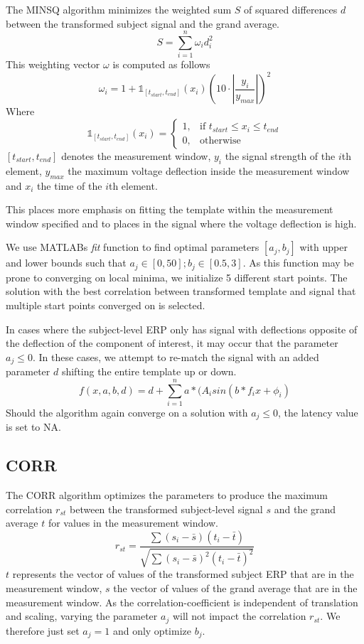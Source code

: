 \documentclass[
  man]{apa7}
\begin{document}
The MINSQ algorithm minimizes the weighted sum \(S\) of squared differences \(d\) between the transformed subject signal and the grand average.
\[S = \sum_{i = 1}^{n}\omega_{i}d_{i}^2\]
This weighting vector \(\omega\) is computed as follows
\[\omega_i = 1+\mathbb{1}_{[t_{start}, t_{end}]}(x_i)(10 \cdot |\frac{y_i}{y_{max}}|)^2\]
Where
\[\mathbb{1}_{[t_{start}, t_{end}]}(x_i) = \begin{cases} 1, & \text{if $t_{start} \le x_i \le t_{end}$} \\ 0, & \text{otherwise}\end{cases}\]\([t_{start}, t_{end}]\) denotes the measurement window, \(y_{i}\) the signal strength of the \(i\)th element, \(y_{max}\) the maximum voltage deflection inside the measurement window and \(x_i\) the time of the \(i\)th element.

This places more emphasis on fitting the template within the measurement window specified and to places in the signal where the voltage deflection is high.

We use MATLABs \emph{fit} function to find optimal parameters \([a_j, b_j]\) with upper and lower bounds such that \(a_j \in [0, 50]; b_j \in [0.5, 3]\). As this function may be prone to converging on local minima, we initialize 5 different start points. The solution with the best correlation between transformed template and signal that multiple start points converged on is selected.

In cases where the subject-level ERP only has signal with deflections opposite of the deflection of the component of interest, it may occur that the parameter \(a_j \le 0\). In these cases, we attempt to re-match the signal with an added parameter \(d\) shifting the entire template up or down.
\[f(x, a,b, d) = d +\sum_{i = 1}^{n} a*(A_isin(b*f_ix + \phi_i)\]
Should the algorithm again converge on a solution with \(a_j \le 0\), the latency value is set to NA.

\hypertarget{corr}{%
\subsection{CORR}\label{corr}}

The CORR algorithm optimizes the parameters to produce the maximum correlation \(r_{st}\) between the transformed subject-level signal \(s\) and the grand average \(t\) for values in the measurement window.
\[r_{st} = \frac{\sum(s_i - \bar{s})(t_{i} - \bar{t})}{\sqrt{\sum(s_i - \bar{s})^2(t_{i} - \bar{t})^2}}\]
\(t\) represents the vector of values of the transformed subject ERP that are in the measurement window, \(s\) the vector of values of the grand average that are in the measurement window. As the correlation-coefficient is independent of translation and scaling, varying the parameter \(a_j\) will not impact the correlation \(r_{st}\). We therefore just set \(a_j = 1\) and only optimize \(b_j\).
\end{document}
